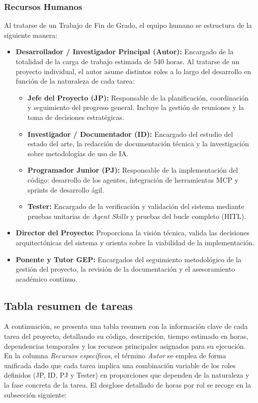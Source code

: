 \documentclass[11pt, letterpaper]{article}
\begin{document}
\subsubsection{Recursos Humanos}
Al tratarse de un Trabajo de Fin de Grado, el equipo humano se estructura de la siguiente manera:
\begin{itemize}
    \item \textbf{Desarrollador / Investigador Principal (Autor):} Encargado de la totalidad de la carga de trabajo estimada de 540 horas. Al tratarse de un proyecto individual, el autor asume distintos roles a lo largo del desarrollo en función de la naturaleza de cada tarea:
    \begin{itemize}
        \item \textbf{Jefe del Proyecto (JP):} Responsable de la planificación, coordinación y seguimiento del progreso general. Incluye la gestión de reuniones y la toma de decisiones estratégicas.
        \item \textbf{Investigador / Documentador (ID):} Encargado del estudio del estado del arte, la redacción de documentación técnica y la investigación sobre metodologías de uso de IA.
        \item \textbf{Programador Junior (PJ):} Responsable de la implementación del código: desarrollo de los agentes, integración de herramientas MCP y sprints de desarrollo ágil.
        \item \textbf{Tester:} Encargado de la verificación y validación del sistema mediante pruebas unitarias de \textit{Agent Skills} y pruebas del bucle completo (HITL).
    \end{itemize}
    \item \textbf{Director del Proyecto:} Proporciona la visión técnica, valida las decisiones arquitectónicas del sistema y orienta sobre la viabilidad de la implementación.
    \item \textbf{Ponente y Tutor GEP:} Encargados del seguimiento metodológico de la gestión del proyecto, la revisión de la documentación y el asesoramiento académico continuo.
\end{itemize}

\subsection{Tabla resumen de tareas}
A continuación, se presenta una tabla resumen con la información clave de cada tarea del proyecto, detallando su código, descripción, tiempo estimado en horas, dependencias temporales y los recursos principales asignados para su ejecución. En la columna \textit{Recursos específicos}, el término \textit{Autor} se emplea de forma unificada dado que cada tarea implica una combinación variable de los roles definidos (JP, ID, PJ y Tester) en proporciones que dependen de la naturaleza y la fase concreta de la tarea. El desglose detallado de horas por rol se recoge en la subsección siguiente:
\end{document}
